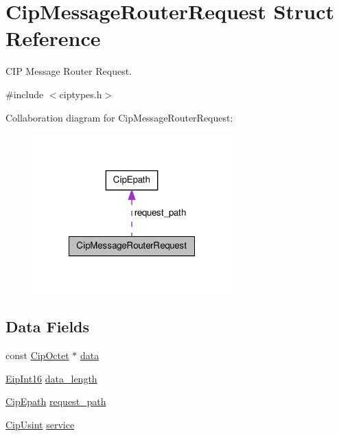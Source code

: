 \hypertarget{structCipMessageRouterRequest}{\section{\-Cip\-Message\-Router\-Request \-Struct \-Reference}
\label{dc/d16/structCipMessageRouterRequest}
}


\-C\-I\-P \-Message \-Router \-Request.  




{\ttfamily \#include $<$ciptypes.\-h$>$}



\-Collaboration diagram for \-Cip\-Message\-Router\-Request\-:
\nopagebreak
\begin{figure}[H]
\begin{center}
\leavevmode
\includegraphics[width=216pt]{dc/db3/structCipMessageRouterRequest__coll__graph}
\end{center}
\end{figure}
\subsection*{\-Data \-Fields}
\begin{DoxyCompactItemize}
\item 
const \hyperlink{typedefs_8h_ab1d6828b2df519496de8762b3ffd54b1}{\-Cip\-Octet} $\ast$ \hyperlink{structCipMessageRouterRequest_ab54e41e4534613f0b0e8b2eb0de96102}{data}
\item 
\hyperlink{typedefs_8h_a3112f543eced50bf7680d12202c50f60}{\-Eip\-Int16} \hyperlink{structCipMessageRouterRequest_a6dfa9c012859e0b0fe18e1501cfce9b6}{data\-\_\-length}
\item 
\hyperlink{structCipEpath}{\-Cip\-Epath} \hyperlink{structCipMessageRouterRequest_ad77c58ca6a008b6dc0fdef151ebb7a8e}{request\-\_\-path}
\item 
\hyperlink{typedefs_8h_a378b726bef4c65cb2ec1c1cdf1205f52}{\-Cip\-Usint} \hyperlink{structCipMessageRouterRequest_a73850f4495f33d0b2a9957a830b8b40f}{service}
\end{DoxyCompactItemize}



